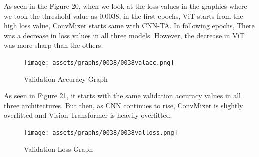 \documentclass[]{article}
\begin{document}
\noindent
As seen in the Figure 20, when we look at the loss values in the graphics where we took the threshold value as 0.0038, in the first epochs, ViT starts from the high loss value, ConvMixer starts same with CNN-TA. In following epochs, There was a decrease in loss values in all three models. However, the decrease in ViT was more sharp than the others.
\begin{figure}[H]
    \begin{center}
        \texttt{[image: assets/graphs/0038/0038valacc.png]}
        \caption{Validation Accuracy Graph}
    \end{center}
\end{figure}

\noindent
As seen in Figure 21, it starts with the same validation accuracy values in all three architectures. But then, as CNN continues to rise, ConvMixer is slightly overfitted and Vision Transformer is heavily overfitted.

\begin{figure}[H]
    \begin{center}
        \texttt{[image: assets/graphs/0038/0038valloss.png]}
        \caption{Validation Loss Graph}
    \end{center}
\end{figure}
\end{document}
